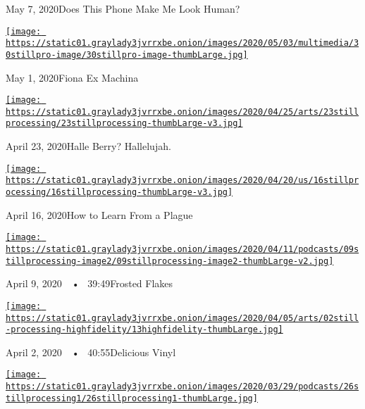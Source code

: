May 7, 2020Does This Phone Make Me Look Human?

\href{https://www.nytimes3xbfgragh.onion/2020/04/30/podcasts/still-processing-fiona-apple-fetch-bolt-cutters.html?action=click\&module=audio-series-bar\&region=header\&pgtype=Article}{\texttt{[image: https://static01.graylady3jvrrxbe.onion/images/2020/05/03/multimedia/30stillpro-image/30stillpro-image-thumbLarge.jpg]}}

May 1, 2020Fiona Ex Machina

\href{https://www.nytimes3xbfgragh.onion/2020/04/23/podcasts/still-processing-halle-berry-sharon-stone-catwoman-quarantine.html?action=click\&module=audio-series-bar\&region=header\&pgtype=Article}{\texttt{[image: https://static01.graylady3jvrrxbe.onion/images/2020/04/25/arts/23stillprocessing/23stillprocessing-thumbLarge-v3.jpg]}}

April 23, 2020Halle Berry? Hallelujah.

\href{https://www.nytimes3xbfgragh.onion/2020/04/16/podcasts/still-processing-AIDS-survive-coronavirus.html?action=click\&module=audio-series-bar\&region=header\&pgtype=Article}{\texttt{[image: https://static01.graylady3jvrrxbe.onion/images/2020/04/20/us/16stillprocessing/16stillprocessing-thumbLarge-v3.jpg]}}

April 16, 2020How to Learn From a Plague

\href{https://www.nytimes3xbfgragh.onion/2020/04/09/podcasts/still-processing-tiger-king.html?action=click\&module=audio-series-bar\&region=header\&pgtype=Article}{\texttt{[image: https://static01.graylady3jvrrxbe.onion/images/2020/04/11/podcasts/09stillprocessing-image2/09stillprocessing-image2-thumbLarge-v2.jpg]}}

April 9, 2020~~•~ 39:49Frosted Flakes

\href{https://www.nytimes3xbfgragh.onion/2020/04/02/podcasts/high-fidelity-zoe-kravitz.html?action=click\&module=audio-series-bar\&region=header\&pgtype=Article}{\texttt{[image: https://static01.graylady3jvrrxbe.onion/images/2020/04/05/arts/02still-processing-highfidelity/13highfidelity-thumbLarge.jpg]}}

April 2, 2020~~•~ 40:55Delicious Vinyl

\href{https://www.nytimes3xbfgragh.onion/2020/03/26/podcasts/still-processing-quarantine.html?action=click\&module=audio-series-bar\&region=header\&pgtype=Article}{\texttt{[image: https://static01.graylady3jvrrxbe.onion/images/2020/03/29/podcasts/26stillprocessing1/26stillprocessing1-thumbLarge.jpg]}}

